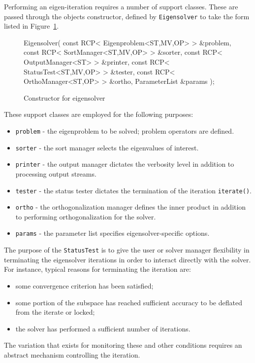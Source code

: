 \documentclass[acmtoms]{acmtrans2m}
\newcommand{\aspace}[1]{\texttt{#1}}
\begin{document}
Performing an eigen-iteration requires a number of support classes.  These are passed
through the objects constructor, defined by \aspace{Eigensolver} to take the form listed
in Figure~\ref{fig:constructor}.

\begin{figure}[htb]
\begin{center}
\begin{boxedverbatim}
Eigensolver(
   const RCP< Eigenproblem<ST,MV,OP> > &problem,
   const RCP< SortManager<ST,MV,OP>  > &sorter,
   const RCP< OutputManager<ST>      > &printer,
   const RCP< StatusTest<ST,MV,OP>   > &tester,
   const RCP< OrthoManager<ST,OP>    > &ortho,
   ParameterList                               &params
 );
\end{boxedverbatim}
\end{center}
\caption{Constructor for eigensolver}
\label{fig:constructor}
\end{figure}

These support classes are employed for the following purposes:
\begin{itemize}
  \item \verb!problem! - the eigenproblem to be solved; problem operators are
  defined.
  \item \verb!sorter! - the sort manager selects the
  eigenvalues of interest.
  \item \verb!printer! - the output manager dictates the verbosity level in addition to
    processing output streams.
  \item \verb!tester! - the status tester dictates the termination of the iteration
  \verb!iterate()!.
  \item \verb!ortho! - the orthogonalization manager defines the inner product
   in addition to performing orthogonalization for the solver.
  \item \verb!params! - the parameter list specifies eigensolver-specific
  options.
\end{itemize}

The purpose of the \aspace{StatusTest} is to give the user or solver
manager flexibility in terminating the eigensolver iterations in
order to interact directly with the solver. For instance, typical
reasons for terminating the iteration are:
\begin{itemize}
  \item some convergence criterion has been satisfied;
  \item some portion of the subspace has reached sufficient accuracy to be
  deflated from the iterate or locked;
  \item the solver has performed a sufficient number of iterations.
\end{itemize}
The variation that exists for monitoring these and other conditions requires an abstract mechanism
controlling the iteration.
\end{document}
